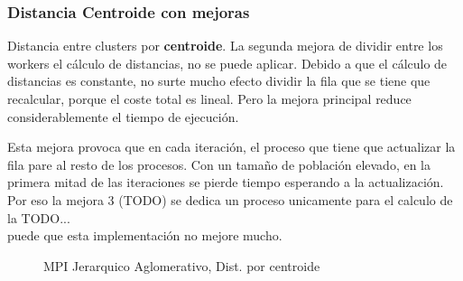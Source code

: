 		
		\subsubsection{Distancia Centroide con mejoras}	
		
			Distancia entre clusters por \textbf{centroide}.
			La segunda mejora de dividir entre los workers el cálculo de distancias, no se puede aplicar. Debido a que el cálculo de distancias es constante, no surte mucho efecto dividir la fila que se tiene que recalcular, porque el coste total es lineal. Pero la mejora principal reduce considerablemente el tiempo de ejecución.
			
			Esta mejora provoca que en cada iteración, el proceso que tiene que actualizar la fila pare al resto de los procesos. Con un tamaño de población elevado, en la primera mitad de las iteraciones se pierde tiempo esperando a la actualización. \\ \color{blue} Por eso la mejora 3 (TODO) se dedica un proceso unicamente para el calculo de la TODO...\\ puede que esta implementación no mejore mucho.
			
			\color{black}
			
			\begin{figure}[!h]
			\centering
			\caption{ MPI Jerarquico Aglomerativo, Dist. por centroide}
			\end{figure}
			
